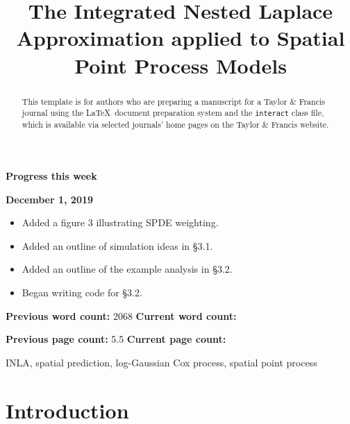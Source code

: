 \documentclass[]{interact}
\begin{document}
{\Large\bf Progress this week}

{\large\bf December 1, 2019}

\begin{itemize}

\item Added a figure 3 illustrating SPDE weighting.

\item Added an outline of simulation ideas in \S 3.1.

\item Added an outline of the example analysis in \S 3.2.

\item Began writing code for \S 3.2.

\end{itemize}

\vfill

\textbf{Previous word count:} 2068 \hfill \textbf{Current word count:} 

\textbf{Previous page count:} 5.5 \hfill \textbf{Current page count:} 

\pagebreak


\title{The Integrated Nested Laplace Approximation applied to Spatial Point Process Models}

\author{
}

\maketitle

\begin{abstract}
This template is for authors who are preparing a manuscript for a Taylor \& Francis journal using the \LaTeX\ document preparation system and the \texttt{interact} class file, which is available via selected journals' home pages on the Taylor \& Francis website.
\end{abstract}

\begin{keywords}
INLA, spatial prediction, log-Gaussian Cox process, spatial point process
\end{keywords}


\section{Introduction}
\end{document}
